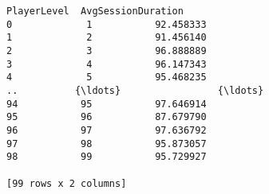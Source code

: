 \documentclass[11pt]{article}
\begin{document}
    \begin{Verbatim}[commandchars=\\\{\}]
    PlayerLevel  AvgSessionDuration
0             1           92.458333
1             2           91.456140
2             3           96.888889
3             4           96.147343
4             5           95.468235
..          {\ldots}                 {\ldots}
94           95           97.646914
95           96           87.679790
96           97           97.636792
97           98           95.873057
98           99           95.729927

[99 rows x 2 columns]
    \end{Verbatim}

    \begin{center}
    \end{center}
    { \hspace*{\fill} \\}
    
\end{document}
